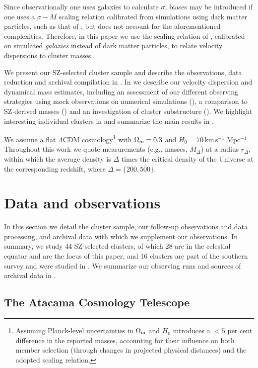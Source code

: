 Since observationally one uses galaxies to calculate $\sigma$, biases may be introduced if one uses a $\sigma-M$ scaling relation calibrated from simulations using dark matter particles, such as that of \cite{evrard08}, but does not account for the aforementioned complexities. Therefore, in this paper we use the scaling relation of \cite{munari13}, calibrated on simulated \textit{galaxies} instead of dark matter particles, to relate velocity dispersions to cluster masses.

We present our SZ-selected cluster sample and describe the observations, data reduction and 
archival compilation in . In  we describe our velocity dispersion and 
dynamical mass estimates, including an assessment of our different observing strategies using mock 
observations on numerical simulations (), a comparison to SZ-derived masses 
() and an investigation of cluster substructure (). We highlight 
interesting individual clusters in  and summarize the main results in 
.

We assume a flat $\Lambda$CDM cosmology\footnote{Assuming Planck-level uncertainties in $\Omega_{\rm m}$ and $H_0$ \citep{planck15xiii} introduces a $<5$ per cent difference in the reported masses, accounting for their influence on both member selection (through changes in projected physical distances) and the adopted scaling relation.} with $\Omega_{\rm m}=0.3$ and $H_0=70\,\mathrm{km\,s^{-1}}$ $\mathrm{Mpc^{-1}}$. Throughout this work we quote measurements (e.g., masses, $M_\Delta$) at a radius $r_\Delta$, within which the average density is $\Delta$ times the critical density of the Universe at the corresponding redshift, where $\Delta=\{200,500\}$. 


\section{Data and observations}\label{s:data}

In this section we detail the cluster sample, our follow-up observations and data processing, and 
archival data with which we supplement our observations. In summary, we study 44 SZ-selected 
clusters, of which 28 are in the celestial equator and are the focus of this paper, and 16 
clusters are part of the southern survey and were studied in \cite{sifon13}. We summarize our 
observing runs and sources of archival data in .

\subsection{The Atacama Cosmology Telescope}

